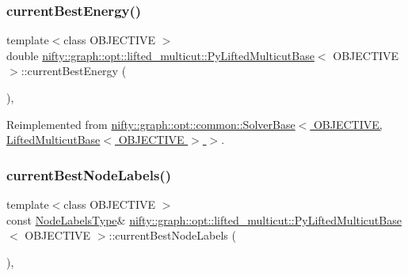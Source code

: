 \subsubsection{\texorpdfstring{current\+Best\+Energy()}{currentBestEnergy()}}
{\footnotesize\ttfamily template$<$class O\+B\+J\+E\+C\+T\+I\+VE $>$ \\
double \hyperlink{classnifty_1_1graph_1_1opt_1_1lifted__multicut_1_1PyLiftedMulticutBase}{nifty\+::graph\+::opt\+::lifted\+\_\+multicut\+::\+Py\+Lifted\+Multicut\+Base}$<$ O\+B\+J\+E\+C\+T\+I\+VE $>$\+::current\+Best\+Energy (\begin{DoxyParamCaption}{ }\end{DoxyParamCaption})\hspace{0.3cm}{\ttfamily [inline]}, {\ttfamily [virtual]}}



Reimplemented from \hyperlink{classnifty_1_1graph_1_1opt_1_1common_1_1SolverBase_a871de6574e6189a0c97c0b2121b07155}{nifty\+::graph\+::opt\+::common\+::\+Solver\+Base$<$ O\+B\+J\+E\+C\+T\+I\+V\+E, Lifted\+Multicut\+Base$<$ O\+B\+J\+E\+C\+T\+I\+V\+E $>$ $>$}.

\mbox{\label{classnifty_1_1graph_1_1opt_1_1lifted__multicut_1_1PyLiftedMulticutBase_aca1f542bc5ea97e60398b90db0630626}} 
\subsubsection{\texorpdfstring{current\+Best\+Node\+Labels()}{currentBestNodeLabels()}}
{\footnotesize\ttfamily template$<$class O\+B\+J\+E\+C\+T\+I\+VE $>$ \\
const \hyperlink{classnifty_1_1graph_1_1opt_1_1lifted__multicut_1_1PyLiftedMulticutBase_afeaa6139205af7449872174c68de2b57}{Node\+Labels\+Type}\& \hyperlink{classnifty_1_1graph_1_1opt_1_1lifted__multicut_1_1PyLiftedMulticutBase}{nifty\+::graph\+::opt\+::lifted\+\_\+multicut\+::\+Py\+Lifted\+Multicut\+Base}$<$ O\+B\+J\+E\+C\+T\+I\+VE $>$\+::current\+Best\+Node\+Labels (\begin{DoxyParamCaption}{ }\end{DoxyParamCaption})\hspace{0.3cm}{\ttfamily [inline]}, {\ttfamily [virtual]}}



